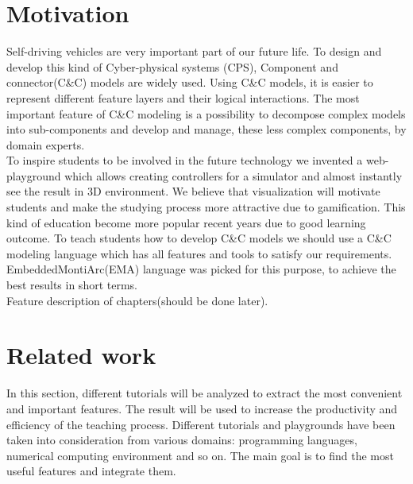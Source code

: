 \setlength{\parindent}{3ex}
\setlength{\parskip}{0ex}

\chapter{Motivation}
Self-driving vehicles are very important part of our future life. To design and develop this kind of Cyber-physical systems (CPS), Component and connector(C\&C) models are widely used. Using C\&C models, it is easier to represent different feature layers and their logical interactions. The most important feature of C\&C modeling is a possibility to decompose complex models into sub-components and develop and manage, these less complex components, by domain experts.\\
To inspire students to be involved in the future technology we invented a web-playground which allows creating controllers for a simulator and almost instantly see the result in 3D environment. We believe that visualization will motivate students and make the studying process more attractive due to gamification. This kind of education become more popular recent years due to good learning outcome\cite{Game}.\newline
To teach students how to develop C\&C models we should use a C\&C modeling language which has all features and tools to satisfy our requirements. EmbeddedMontiArc(EMA) \cite{Mon10} language was picked for this purpose, to achieve the best results in short terms.\\

Feature description of chapters(should be done later).

\cleardoublepage

\chapter{Related work}
In this section, different tutorials will be analyzed to extract the most convenient and important features. The result will be used to increase the productivity and efficiency of the teaching process. Different tutorials and playgrounds have been taken into consideration from various domains: programming languages, numerical computing environment and so on. The main goal is to find the most useful features and integrate them.

